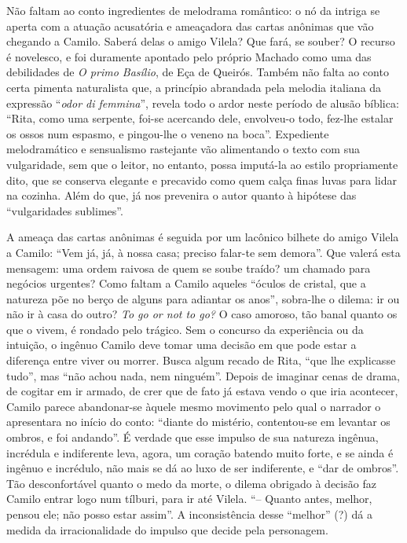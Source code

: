 Não faltam ao conto ingredientes de melodrama romântico: o nó da intriga
se aperta com a atuação acusatória e ameaçadora das cartas anônimas que
vão chegando a Camilo. Saberá delas o amigo Vilela? Que fará, se souber?
O recurso é novelesco, e foi duramente apontado pelo próprio Machado
como uma das debilidades de \emph{O primo Basílio}, de Eça de Queirós.
Também não falta ao conto certa pimenta naturalista que, a princípio
abrandada pela melodia italiana da expressão ``\emph{odor di femmina}'',
revela todo o ardor neste período de alusão bíblica: ``Rita, como uma
serpente, foi-se acercando dele, envolveu-o todo, fez-lhe estalar os
ossos num espasmo, e pingou-lhe o veneno na boca''. Expediente
melodramático e sensualismo rastejante vão alimentando o texto com sua
vulgaridade, sem que o leitor, no entanto, possa imputá-la ao estilo
propriamente dito, que se conserva elegante e precavido como quem calça
finas luvas para lidar na cozinha. Além do que, já nos prevenira o autor
quanto à hipótese das ``vulgaridades sublimes''.

A ameaça das cartas anônimas é seguida por um lacônico bilhete do amigo
Vilela a Camilo: ``Vem já, já, à nossa casa; preciso falar-te sem
demora''. Que valerá esta mensagem: uma ordem raivosa de quem se soube
traído? um chamado para negócios urgentes? Como faltam a Camilo aqueles
``óculos de cristal, que a natureza põe no berço de alguns para adiantar
os anos'', sobra-lhe o dilema: ir ou não ir à casa do outro? \emph{To go
or not to go?} O caso amoroso, tão banal quanto os que o vivem, é
rondado pelo trágico. Sem o concurso da experiência ou da intuição, o
ingênuo Camilo deve tomar uma decisão em que pode estar a diferença
entre viver ou morrer. Busca algum recado de Rita, ``que lhe explicasse
tudo'', mas ``não achou nada, nem ninguém''. Depois de imaginar cenas de
drama, de cogitar em ir armado, de crer que de fato já estava vendo o
que iria acontecer, Camilo parece abandonar-se àquele mesmo movimento
pelo qual o narrador o apresentara no início do conto: ``diante do
mistério, contentou-se em levantar os ombros, e foi andando''. É verdade
que esse impulso de sua natureza ingênua, incrédula e indiferente leva,
agora, um coração batendo muito forte, e se ainda é ingênuo e incrédulo,
não mais se dá ao luxo de ser indiferente, e ``dar de ombros''. Tão
desconfortável quanto o medo da morte, o dilema obrigado à decisão faz
Camilo entrar logo num tílburi, para ir até Vilela. ``-- Quanto antes,
melhor, pensou ele; não posso estar assim''. A inconsistência desse
``melhor'' (?) dá a medida da irracionalidade do impulso que decide pela
personagem.

